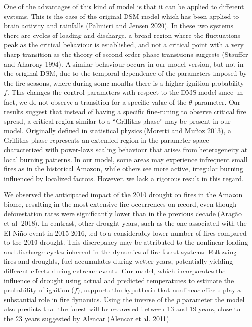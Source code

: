 \documentclass[
]{article}
\begin{document}
One of the advantages of this kind of model is that it can be applied to
different systems. This is the case of the original DSM model which has
been applied to brain activity and rainfalls (Palmieri and Jensen 2020).
In these two systems there are cycles of loading and discharge, a broad
region where the fluctuations peak as the critical behaviour is
established, and not a critical point with a very sharp transition as
the theory of second order phase transitions suggests (Stauffer and
Aharony 1994). A similar behaviour occurs in our model version, but not
in the original DSM, due to the temporal dependence of the parameters
imposed by the fire seasons, where during some months there is a higher
ignition probability \(f\). This changes the control parameters with
respect to the DMS model since, in fact, we do not observe a transition
for a specific value of the \(\theta\) parameter. Our results suggest
that instead of having a specific fine-tuning to observe critical fire
spread, a critical region similar to a ``Griffiths phase'' may be
present in our model. Originally defined in statistical physics (Moretti
and Muñoz 2013), a Griffiths phase represents an extended region in the
parameter space characterized with power-laws scaling behaviour that
arises from heterogeneity at local burning patterns. In our model, some
areas may experience infrequent small fires as in the historical Amazon,
while others see more active, irregular burning influenced by localized
factors. However, we lack a rigorous result in this regard.

We observed the anticipated impact of the 2010 drought on fires in the
Amazon biome, resulting in the most extensive fire occurrences on
record, even though deforestation rates were significantly lower than in
the previous decade (Aragão et al. 2018). In contrast, other drought
years, such as the one associated with the El Niño event in 2015-2016,
led to a considerably lower number of fires compared to the 2010
drought. This discrepancy may be attributed to the nonlinear loading and
discharge cycles inherent in the dynamics of fire-forest systems.
Following fires and droughts, fuel accumulates during wetter years,
potentially yielding different effects during extreme events. Our model,
which incorporates the influence of drought using actual and predicted
temperatures to estimate the probability of ignition (\(f\)), supports
the hypothesis that nonlinear effects play a substantial role in fire
dynamics. Using the inverse of the \(p\) parameter the model also
predicts that the forest will be recovered between 13 and 19 years,
close to the 23 years suggested by Alencar (Alencar et al. 2011).
\end{document}
